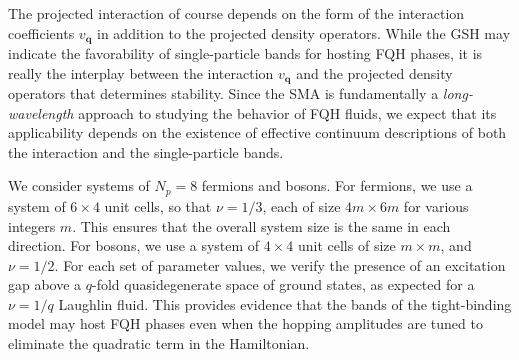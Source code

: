 \documentclass[aps,prb,twocolumn,letterpaper,twoside,nobalancelastpage,groupedaddress,amsmath,amssymb,floatfix,citeautoscript]{revtex4-1}
\begin{document}
The projected interaction of course depends on the form of the interaction coefficients $v_{\mathbf{q}}$ in addition to the projected density operators. While the GSH may indicate the favorability of single-particle bands for hosting FQH phases, it is really the interplay between the interaction $v_\mathbf{q}$ and the projected density operators that determines stability. Since the SMA is fundamentally a \textit{long-wavelength} approach to studying the behavior of FQH fluids, we expect that its applicability depends on the existence of effective continuum descriptions of both the interaction and the single-particle bands.




We consider systems of $N_p = 8$ fermions and bosons. For fermions, we use a system of $6 \times 4$ unit cells, so that $\nu=1/3$, each of size $4m \times 6m$ for various integers $m$. This ensures that the overall system size is the same in each direction. For bosons, we use a system of $4 \times 4$ unit cells of size $m \times m$, and $\nu=1/2$. For each set of parameter values, we verify the presence of an excitation gap above a $q$-fold quasidegenerate space of ground states, as expected for a $\nu=1/q$ Laughlin fluid. This provides evidence that the bands of the tight-binding model may host FQH phases even when the hopping amplitudes are tuned to eliminate the quadratic term in the Hamiltonian. 
\end{document}
